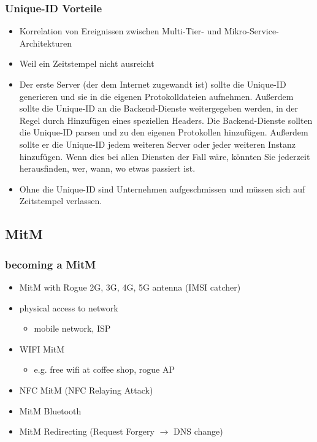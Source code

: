 \subsubsection{Unique-ID Vorteile}
\begin{itemize}
    \item Korrelation von Ereignissen zwischen Multi-Tier- und Mikro-Service-Architekturen
    \item Weil ein Zeitstempel nicht ausreicht
    \item Der erste Server (der dem Internet zugewandt ist) sollte die Unique-ID generieren und sie in die eigenen Protokolldateien aufnehmen. Außerdem sollte die Unique-ID an die Backend-Dienste weitergegeben werden, in der Regel durch Hinzufügen eines speziellen Headers. Die Backend-Dienste sollten die Unique-ID parsen und zu den eigenen Protokollen hinzufügen. Außerdem sollte er die Unique-ID jedem weiteren Server oder jeder weiteren Instanz hinzufügen. Wenn dies bei allen Diensten der Fall wäre, könnten Sie jederzeit herausfinden, wer, wann, wo etwas passiert ist.
    \item Ohne die Unique-ID sind Unternehmen aufgeschmissen und müssen sich auf Zeitstempel verlassen.
\end{itemize}

\newpage

\subsection{MitM}

\subsubsection{becoming a MitM}
\begin{itemize}
    \item MitM with Rogue 2G, 3G, 4G, 5G antenna (IMSI catcher)
    \item physical access to network
    \begin{itemize}
        \item mobile network, ISP
    \end{itemize}
    \item WIFI MitM
    \begin{itemize}
        \item e.g. free wifi at coffee shop, rogue AP
    \end{itemize}
    \item NFC MitM (NFC Relaying Attack)
    \item MitM Bluetooth
    \item MitM Redirecting (Request Forgery $\rightarrow$ DNS change)
\end{itemize}

